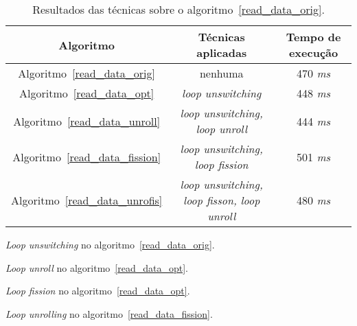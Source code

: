 \begin{table}[ht]
  \label{tabela_read_data}
\begin{center}
  \begin{tabular}{|c|c|c|}
    \hline
    \textbf{Algoritmo} & \textbf{Técnicas aplicadas} & \textbf{Tempo de execução}\\
    \hline
    Algoritmo~\ref{read_data_orig} & nenhuma & 470 \textit{ms} \\
    \hline
    Algoritmo~\ref{read_data_opt} & \textit{loop unswitching} & 448 \textit{ms} \\
    \hline
    Algoritmo~\ref{read_data_unroll} & \textit{loop unswitching, loop unroll} & 444 \textit{ms} \\
    \hline
    Algoritmo~\ref{read_data_fission} & \textit{loop unswitching, loop fission} & 501 \textit{ms} \\
    \hline
  Algoritmo~\ref{read_data_unrofis} & \textit{loop unswitching, loop fisson, loop unroll} &  480 \textit{ms} \\
    \hline
  \end{tabular}
  \caption{Resultados das técnicas sobre o algoritmo~\ref{read_data_orig}.}
\end{center}
\end{table}


\begin{algorithm}[H]
  \caption{\textit{Loop unswitching} no algoritmo~\ref{read_data_orig}.}
    \label{read_data_opt}

\end{algorithm}

\begin{algorithm}[H]
  \caption{\textit{Loop unroll} no algoritmo~\ref{read_data_opt}.}
    \label{read_data_unroll}

\end{algorithm}

\begin{algorithm}[H]
  \caption{\textit{Loop fission} no algoritmo~\ref{read_data_opt}.}
    \label{read_data_fission}

\end{algorithm}

\begin{algorithm}[H]
  \caption{\textit{Loop unrolling} no algoritmo~\ref{read_data_fission}.}
    \label{read_data_unrofis}

\end{algorithm}

